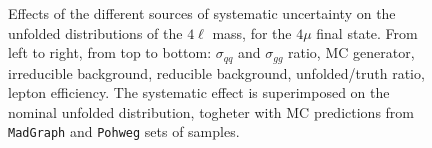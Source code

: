 \begin{figure}[hbtp]
\begin{center}
    \caption{Effects of the different sources of systematic uncertainty on the unfolded distributions of the $4\ell$ mass, for the     
    $4\mu$ final state. From left to right, from top to bottom: $\sigma_{qq}$ and $\sigma_{gg}$ ratio, MC generator, irreducible background,
reducible background, unfolded/truth ratio, lepton efficiency. The systematic effect is superimposed on the nominal unfolded distribution, togheter with MC predictions from \texttt{MadGraph} and \texttt{Pohweg} sets of samples.}
    \label{fig:Mass_syst_4m}
  \end{center}
\end{figure}

